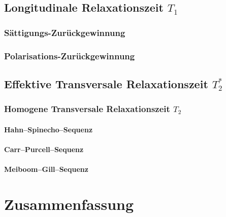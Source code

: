 \section{Longitudinale Relaxationszeit $T_1$}
\subsection{Sättigungs-Zurückgewinnung}
\subsection{Polarisations-Zurückgewinnung}

\section{Effektive Transversale Relaxationszeit $T_2^*$}
\subsection{Homogene Transversale Relaxationszeit $T_2$}
\subsubsection{Hahn–Spinecho–Sequenz}
\subsubsection{Carr–Purcell–Sequenz}
\subsubsection{Meiboom–Gill–Sequenz}



\FloatBarrier
\chapter{Zusammenfassung}

\fehlt


